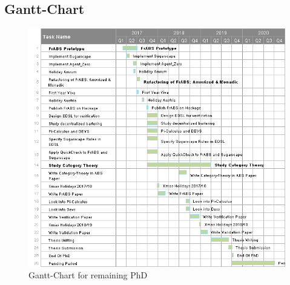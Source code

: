 \begin{appendices}

\chapter{Gantt-Chart}
\label{app:gantt}
\begin{landscape}
	\begin{figure}
		\label{fig:gantt}
  		\caption{Gantt-Chart for remaining PhD}
  		\centering
  		\includegraphics[width=1.2\textwidth]{./charts/gantt.png}
	\end{figure}
\end{landscape}


\end{appendices}
